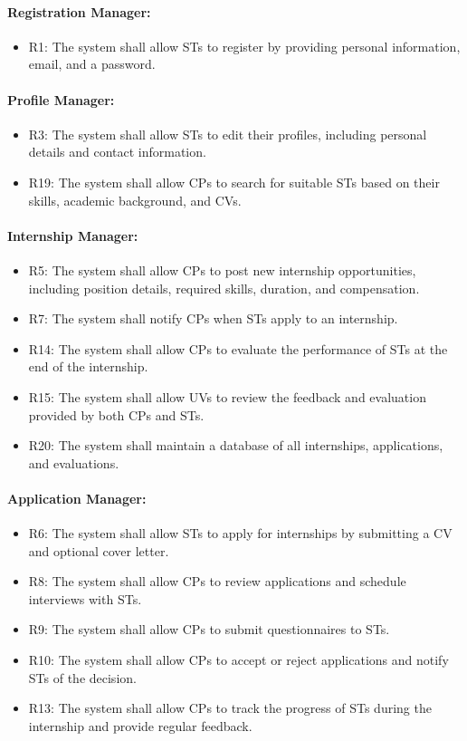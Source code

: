\paragraph{Registration Manager:}
\begin{itemize}
    \item R1: The system shall allow STs to register by providing personal information, email, and a password.
\end{itemize}

\paragraph{Profile Manager:}
\begin{itemize}
    \item R3: The system shall allow STs to edit their profiles, including personal details and contact information.
    \item R19: The system shall allow CPs to search for suitable STs based on their skills, academic background, and CVs.
\end{itemize}

\paragraph{Internship Manager:}
\begin{itemize}
    \item R5: The system shall allow CPs to post new internship opportunities, including position details, required skills, duration, and compensation.
    \item R7: The system shall notify CPs when STs apply to an internship.
    \item R14: The system shall allow CPs to evaluate the performance of STs at the end of the internship.
    \item R15: The system shall allow UVs to review the feedback and evaluation provided by both CPs and STs.
    \item R20: The system shall maintain a database of all internships, applications, and evaluations.
\end{itemize}

\paragraph{Application Manager:}
\begin{itemize}
    \item R6: The system shall allow STs to apply for internships by submitting a CV and optional cover letter.
    \item R8: The system shall allow CPs to review applications and schedule interviews with STs.
    \item R9: The system shall allow CPs to submit questionnaires to STs.
    \item R10: The system shall allow CPs to accept or reject applications and notify STs of the decision.
    \item R13: The system shall allow CPs to track the progress of STs during the internship and provide regular feedback.
\end{itemize}


